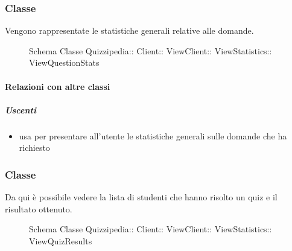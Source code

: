 \subsubsection{Classe }
Vengono rappresentate le statistiche generali relative alle domande.
\begin{figure}[H]
\centering
\noindent{}
\caption[Schema Classe ViewQuestionStats]{Schema Classe Quizzipedia:: Client:: ViewClient:: ViewStatistics:: ViewQuestionStats}
\end{figure}
\paragraph{Relazioni con altre classi}
\subparagraph{Uscenti}
\begin{itemize}
\item usa  per presentare all'utente le statistiche generali sulle domande che ha richiesto
\end{itemize}
\subsubsection{Classe }
Da qui è possibile vedere la lista di studenti che hanno risolto un quiz e il risultato ottenuto.
\begin{figure}[H]
\centering
\noindent{}
\caption[Schema Classe ViewQuizResults]{Schema Classe Quizzipedia:: Client:: ViewClient:: ViewStatistics:: ViewQuizResults}
\end{figure}
